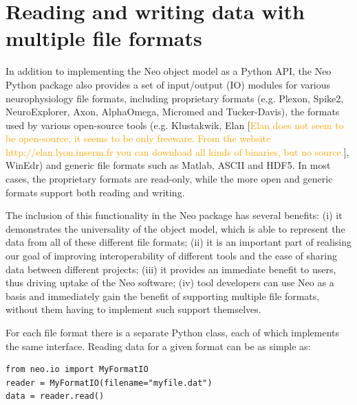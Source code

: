 \documentclass{frontiers}
\newcommand{\florent}[1]{[\textcolor{Orange}{#1}]}
\begin{document}
\section{Reading and writing data with multiple file formats}


In addition to implementing the Neo object model as a Python API, the Neo Python package also provides a set of input/output (IO) modules for various neurophysiology file formats, including proprietary formats (e.g. Plexon, Spike2, NeuroExplorer, Axon, AlphaOmega, Micromed and Tucker-Davis), the formats used by various open-source tools (e.g. Klustakwik, Elan \florent{Elan does not seem to be open-source, it seems to be only freeware. From the website http://elan.lyon.inserm.fr you can download all kinds of binaries, but no source.}, WinEdr) and generic file formats such as Matlab, ASCII and HDF5. 
In most cases, the proprietary formats are read-only, while the more open and generic formats support both reading and writing.

The inclusion of this functionality in the Neo package has several benefits:
(i) it demonstrates the universality of the object model, which is able to represent the data from all of these different file formats;
(ii) it is an important part of realising our goal of improving interoperability of different tools and the ease of sharing data between different projects;
(iii) it provides an immediate benefit to users, thus driving uptake of the Neo software;
(iv) tool developers can use Neo as a basis and immediately gain the benefit of supporting multiple file formats, without them having to implement such support themselves.


For each file format there is a separate Python class, each of which implements the same interface. Reading data for a given format can be as simple as:

\begin{lstlisting}[style=display]
from neo.io import MyFormatIO
reader = MyFormatIO(filename="myfile.dat")
data = reader.read()
\end{lstlisting}
\end{document}
